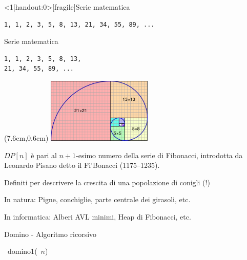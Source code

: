 \begin{frame}<1|handout:0>[fragile]{Serie matematica}

\vspace{-9pt}

\begin{lstlisting}
1, 1, 2, 3, 5, 8, 13, 21, 34, 55, 89, ...
\end{lstlisting}


\end{frame}


\begin{frame}[fragile]{Serie matematica}

\vspace{-9pt}

\begin{lstlisting}
1, 1, 2, 3, 5, 8, 13, 
21, 34, 55, 89, ...
\end{lstlisting}

\begin{textblock*}{5cm}(7.6cm,0.6cm) %
\includegraphics[width=5cm]{fibonacci.png}
\end{textblock*}

\begin{myboxtitle}
$\mathit{DP}[n]$ è pari al $n+1$-esimo numero della serie di Fibonacci, introdotta da Leonardo Pisano detto il Fi'Bonacci (1175--1235).
\end{myboxtitle}

\BIL
\item Definiti per descrivere la crescita di una popolazione di conigli (!)
\item In natura: Pigne, conchiglie, parte centrale dei girasoli, etc.
\item In informatica: Alberi AVL minimi, Heap di Fibonacci, etc.
\EIL

\end{frame}


\begin{frame}[fragile]{Domino - Algoritmo ricorsivo}

\vspace{-9pt}

\begin{Procedure}
\caption[A]{\INTEGER\ \textsf{domino1}(\INTEGER\ $n$)}
\end{Procedure}


\end{frame}

